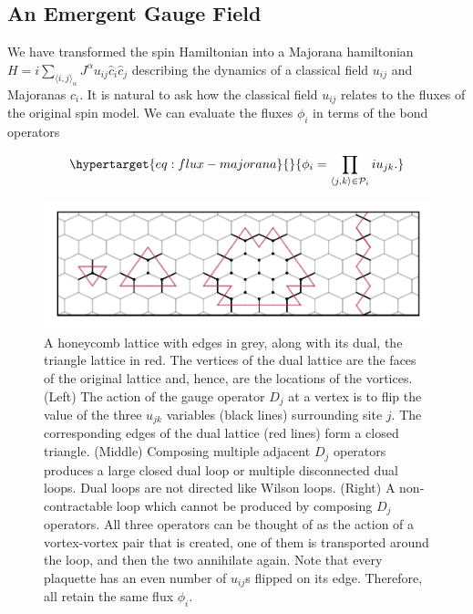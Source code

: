 \hypertarget{an-emergent-gauge-field}{%
\subsection{An Emergent Gauge Field}\label{an-emergent-gauge-field}}

We have transformed the spin Hamiltonian into a Majorana hamiltonian \(H = i \sum_{\langle i,j\rangle_\alpha} J^{\alpha} u_{ij} \hat{c}_i \hat{c}_j\) describing the dynamics of a classical field \(u_{ij}\) and Majoranas \(c_i\). It is natural to ask how the classical field \(u_{ij}\) relates to the fluxes of the original spin model. We can evaluate the fluxes \(\phi_i\) in terms of the bond operators

\begin{equation}\protect\hypertarget{eq:flux-majorana}{}{\phi_i = \prod_{\langle j,k\rangle \in \mathcal{P}_i} i u_{jk}.}\label{eq:flux-majorana}\end{equation}

\hypertarget{fig:gauge_symmetries}{%
\begin{figure}
\centering
\includegraphics[width=1\textwidth,height=\textheight]{figure_code/amk_chapter/intro/gauge_symmetries/gauge_symmetries}
\caption[{Gauge Symmetries}]{A honeycomb lattice with edges in grey, along with its dual, the triangle lattice in red. The vertices of the dual lattice are the faces of the original lattice and, hence, are the locations of the vortices. (Left) The action of the gauge operator \(D_j\) at a vertex is to flip the value of the three \(u_{jk}\) variables (black lines) surrounding site \(j\). The corresponding edges of the dual lattice (red lines) form a closed triangle. (Middle) Composing multiple adjacent \(D_j\) operators produces a large closed dual loop or multiple disconnected dual loops. Dual loops are not directed like Wilson loops. (Right) A non-contractable loop which cannot be produced by composing \(D_j\) operators. All three operators can be thought of as the action of a vortex-vortex pair that is created, one of them is transported around the loop, and then the two annihilate again. Note that every plaquette has an even number of \(u_{ij}\)s flipped on its edge. Therefore, all retain the same flux \(\phi_i\).}
\label{fig:gauge_symmetries}
\end{figure}
}

